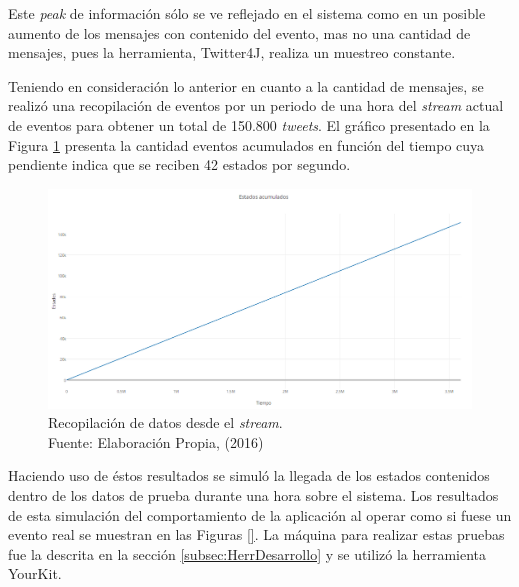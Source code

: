 Este \textit{peak} de información sólo se ve reflejado en el sistema como en un posible aumento de los mensajes con contenido del evento, mas no una cantidad de mensajes, pues la herramienta, Twitter4J, realiza un muestreo constante. 

Teniendo en consideración lo anterior en cuanto a la cantidad de mensajes, se realizó una recopilación de eventos por un periodo de una hora del \textit{stream} actual de eventos para obtener un total de 150.800 \textit{tweets}. El gráfico presentado en la Figura \ref{fig:graficoAcumulado} presenta la cantidad eventos acumulados en función del tiempo cuya pendiente indica que se reciben 42 estados por segundo.

\begin{figure}[H]
        \centering
        \captionsetup{justification=centering}
        \includegraphics[scale=0.5]{images/DatosAcumulados.png}
        \caption[Recopilación de datos desde el \textit{stream}.]{Recopilación de datos desde el \textit{stream}.\\Fuente: Elaboración Propia, (2016)}
        \label{fig:graficoAcumulado}
\end{figure}

Haciendo uso de éstos resultados se simuló la llegada de los estados contenidos dentro de los datos de prueba durante una hora sobre el sistema. Los resultados de esta simulación del comportamiento de la aplicación al operar como si fuese un evento real se muestran en las Figuras \ref{}. La máquina para realizar estas pruebas fue la descrita en la sección \ref{subsec:HerrDesarrollo} y se utilizó la herramienta YourKit.


